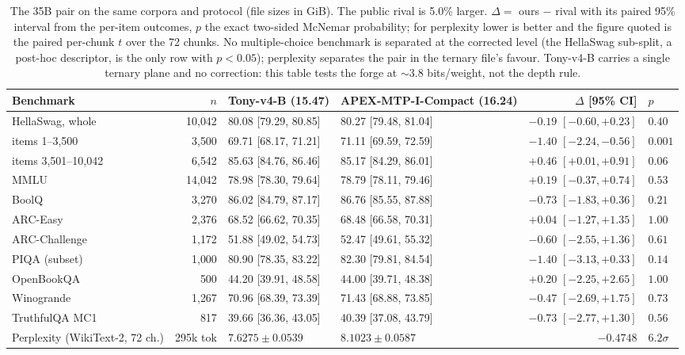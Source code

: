 \documentclass[10pt]{article} %
\begin{document}
\begin{table}[t]
\centering
\small
\setlength{\tabcolsep}{3pt}
\footnotesize
\begin{tabular}{@{}l r l l r l@{}}
\toprule
Benchmark & $n$ & Tony-v4-B (15.47) & APEX-MTP-I-Compact (16.24) & $\Delta$ [95\% CI] & $p$ \\
\midrule
HellaSwag, whole & 10{,}042 & 80.08 [79.29, 80.85] & 80.27 [79.48, 81.04] & $-0.19$ $[-0.60, +0.23]$ & $0.40$ \\
\quad items 1--3,500 & 3{,}500 & 69.71 [68.17, 71.21] & 71.11 [69.59, 72.59] & $-1.40$ $[-2.24, -0.56]$ & $0.001$ \\
\quad items 3,501--10,042 & 6{,}542 & 85.63 [84.76, 86.46] & 85.17 [84.29, 86.01] & $+0.46$ $[+0.01, +0.91]$ & $0.06$ \\
MMLU & 14{,}042 & 78.98 [78.30, 79.64] & 78.79 [78.11, 79.46] & $+0.19$ $[-0.37, +0.74]$ & $0.53$ \\
BoolQ & 3{,}270 & 86.02 [84.79, 87.17] & 86.76 [85.55, 87.88] & $-0.73$ $[-1.83, +0.36]$ & $0.21$ \\
ARC-Easy & 2{,}376 & 68.52 [66.62, 70.35] & 68.48 [66.58, 70.31] & $+0.04$ $[-1.27, +1.35]$ & $1.00$ \\
ARC-Challenge & 1{,}172 & 51.88 [49.02, 54.73] & 52.47 [49.61, 55.32] & $-0.60$ $[-2.55, +1.36]$ & $0.61$ \\
PIQA (subset) & 1{,}000 & 80.90 [78.35, 83.22] & 82.30 [79.81, 84.54] & $-1.40$ $[-3.13, +0.33]$ & $0.14$ \\
OpenBookQA & 500 & 44.20 [39.91, 48.58] & 44.00 [39.71, 48.38] & $+0.20$ $[-2.25, +2.65]$ & $1.00$ \\
Winogrande & 1{,}267 & 70.96 [68.39, 73.39] & 71.43 [68.88, 73.85] & $-0.47$ $[-2.69, +1.75]$ & $0.73$ \\
TruthfulQA MC1 & 817 & 39.66 [36.36, 43.05] & 40.39 [37.08, 43.79] & $-0.73$ $[-2.77, +1.30]$ & $0.56$ \\
Perplexity (WikiText-2, 72 ch.) & 295k tok & $\mathbf{7.6275} \pm 0.0539$ & $8.1023 \pm 0.0587$ & $-0.4748$ & $6.2\sigma$ \\
\bottomrule
\end{tabular}
\caption{The 35B pair on the same corpora and protocol (file sizes
in GiB). The public rival is 5.0\% larger. $\Delta =$ ours $-$ rival with its
paired 95\% interval from the per-item outcomes, $p$ the exact two-sided
McNemar probability; for perplexity lower is better and the figure quoted is
the paired per-chunk $t$ over the 72 chunks. No multiple-choice benchmark is
separated at the corrected level (the HellaSwag sub-split, a post-hoc
descriptor, is the only row with $p < 0.05$); perplexity separates the pair in
the ternary file's favour. Tony-v4-B carries a single ternary plane and no
correction: this table tests the forge at $\sim$3.8 bits/weight, not the depth
rule.}
\label{tab:bench35}
\end{table}
\end{document}
